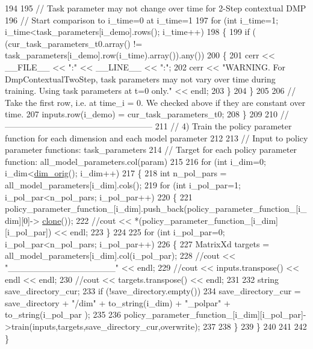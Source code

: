 \begin{DoxyCode}
194     
195     \textcolor{comment}{// Task parameter may not change over time for 2-Step contextual DMP}
196     \textcolor{comment}{// Start comparison to i\_time=0 at i\_time=1}
197     \textcolor{keywordflow}{for} (\textcolor{keywordtype}{int} i\_time=1; i\_time<task\_parameters[i\_demo].rows(); i\_time++)
198     \{
199       \textcolor{keywordflow}{if} ( (cur\_task\_parameters\_t0.array() != task\_parameters[i\_demo].row(i\_time).array()).any())
200       \{
201         cerr << \_\_FILE\_\_ << \textcolor{stringliteral}{":"} << \_\_LINE\_\_ << \textcolor{stringliteral}{":"};
202         cerr << \textcolor{stringliteral}{"WARNING. For DmpContextualTwoStep, task parameters may not vary over time during training.
       Using task parameters at t=0 only."} << endl;
203       \}
204     \}
205 
206     \textcolor{comment}{// Take the first row, i.e. at time\_i = 0. We checked above if they are constant over time.}
207     inputs.row(i\_demo) = cur\_task\_parameters\_t0;
208   \}
209 
210   \textcolor{comment}{//-----------------------------------------------------}
211   \textcolor{comment}{// 4) Train the policy parameter function for each dimension and each model parameter}
212   
213   \textcolor{comment}{// Input to policy parameter functions: task\_parameters}
214   \textcolor{comment}{// Target for each policy parameter function: all\_model\_parameters.col(param)}
215   
216   \textcolor{keywordflow}{for} (\textcolor{keywordtype}{int} i\_dim=0; i\_dim<\hyperlink{group__DynamicalSystems_ga93d7cbbf2e471b00f124e41706405a05}{dim\_orig}(); i\_dim++)
217   \{
218     \textcolor{keywordtype}{int} n\_pol\_pars = all\_model\_parameters[i\_dim].cols();
219     \textcolor{keywordflow}{for} (\textcolor{keywordtype}{int} i\_pol\_par=1; i\_pol\_par<n\_pol\_pars; i\_pol\_par++)
220     \{
221       policy\_parameter\_function\_[i\_dim].push\_back(policy\_parameter\_function\_[i\_dim][0]->
      \hyperlink{classDmpBbo_1_1Dmp_ace8e32350e4feb2c7ea6b5153c7dc606}{clone}());
222       \textcolor{comment}{//cout << *(policy\_parameter\_function\_[i\_dim][i\_pol\_par]) << endl;}
223     \}
224 
225     \textcolor{keywordflow}{for} (\textcolor{keywordtype}{int} i\_pol\_par=0; i\_pol\_par<n\_pol\_pars; i\_pol\_par++)
226     \{
227       MatrixXd targets = all\_model\_parameters[i\_dim].col(i\_pol\_par);
228       \textcolor{comment}{//cout << "\_\_\_\_\_\_\_\_\_\_\_\_\_\_\_\_\_" << endl;}
229       \textcolor{comment}{//cout << inputs.transpose() << endl << endl;}
230       \textcolor{comment}{//cout << targets.transpose() << endl;}
231       
232       \textcolor{keywordtype}{string} save\_directory\_cur;
233       \textcolor{keywordflow}{if} (!save\_directory.empty())
234           save\_directory\_cur = save\_directory + \textcolor{stringliteral}{"/dim"} + to\_string(i\_dim) + \textcolor{stringliteral}{"\_polpar"} + to\_string(i\_pol\_par
      );
235       
236       policy\_parameter\_function\_[i\_dim][i\_pol\_par]->train(inputs,targets,save\_directory\_cur,overwrite);
237     
238     \}
239   \}
240   
241   
242 \}
\end{DoxyCode}


